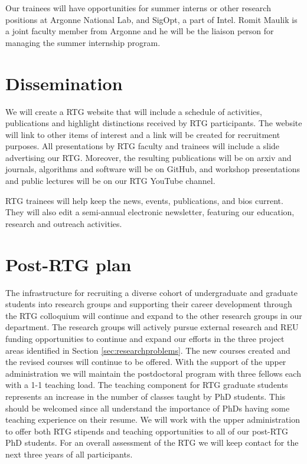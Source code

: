 \documentclass[11pt]{NSFamsart}
\begin{document}
Our trainees will have opportunities for summer interns or other research positions at Argonne National Lab, and  SigOpt, a part of Intel. Romit Maulik is a joint faculty member from Argonne     and he will be the liaison person for managing the summer internship program. 





 \section{Dissemination} 
 We will create a   RTG website that will include a schedule of activities, publications and highlight
distinctions received by RTG participants. The website will link to other items of interest and a link will
be created for recruitment purposes. All presentations by RTG faculty and trainees  will    include a slide advertising our RTG.
Moreover, the resulting publications   will be on arxiv and journals, algorithms and software will be on GitHub, and workshop  presentations and  public lectures will be on our RTG YouTube channel.

 

RTG trainees will help keep the news, events, publications, and bios current.  They will also edit a semi-annual electronic newsletter, 
featuring our education, research  and outreach  activities. 

 
 \section{Post-RTG plan}
The infrastructure for recruiting a diverse cohort of undergraduate and graduate students into research groups and supporting their career development through the RTG colloquium will continue and expand to the other research groups in our department.  The research groups will actively pursue external research and REU funding opportunities to continue and expand our efforts in the three project areas identified in Section \ref{sec:researchproblems}. The new courses created and the revised courses will continue to be offered.
With the support of the upper administration we will maintain the postdoctoral program with three
fellows each with a 1-1 teaching load. The teaching component for RTG graduate students represents
an increase in the number of classes taught by PhD students.  This should be welcomed since all  understand the importance of PhDs having some teaching experience on their resume.
We will work with the upper administration to offer both RTG
stipends and teaching opportunities to all of our post-RTG PhD students.
For an overall assessment of the RTG we will keep contact for the next three years of all participants.
\end{document}
